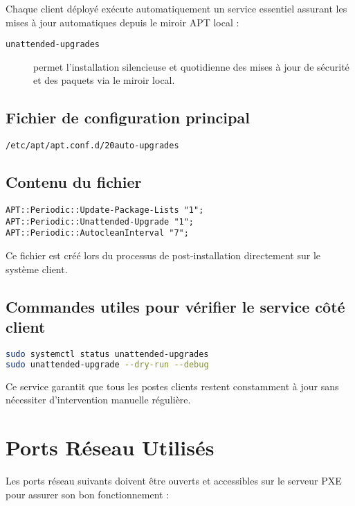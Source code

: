 \documentclass[a4paper,12pt]{article}
\begin{document}
Chaque client déployé exécute automatiquement un service essentiel assurant les mises à jour automatiques depuis le miroir APT local :

\begin{description}
  \item[\texttt{unattended-upgrades}] permet l'installation silencieuse et quotidienne des mises à jour de sécurité et des paquets via le miroir local.
\end{description}

\subsection{Fichier de configuration principal}
\begin{lstlisting}
/etc/apt/apt.conf.d/20auto-upgrades
\end{lstlisting}

\subsection{Contenu du fichier}
\begin{lstlisting}
APT::Periodic::Update-Package-Lists "1";
APT::Periodic::Unattended-Upgrade "1";
APT::Periodic::AutocleanInterval "7";
\end{lstlisting}

Ce fichier est créé lors du processus de post-installation directement sur le système client.

\subsection{Commandes utiles pour vérifier le service côté client}
\begin{lstlisting}[language=bash]
sudo systemctl status unattended-upgrades
sudo unattended-upgrade --dry-run --debug
\end{lstlisting}

Ce service garantit que tous les postes clients restent constamment à jour sans nécessiter d’intervention manuelle régulière.

\section{Ports Réseau Utilisés}
Les ports réseau suivants doivent être ouverts et accessibles sur le serveur PXE pour assurer son bon fonctionnement :
\end{document}
